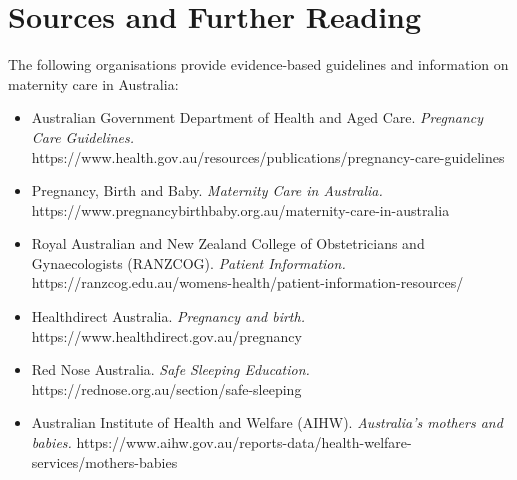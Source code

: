 \section*{Sources and Further Reading}
The following organisations provide evidence-based guidelines and information on maternity care in Australia:
\begin{itemize}
    \item Australian Government Department of Health and Aged Care. \textit{Pregnancy Care Guidelines.} https://www.health.gov.au/resources/publications/pregnancy-care-guidelines
    \item Pregnancy, Birth and Baby. \textit{Maternity Care in Australia.} https://www.pregnancybirthbaby.org.au/maternity-care-in-australia
    \item Royal Australian and New Zealand College of Obstetricians and Gynaecologists (RANZCOG). \textit{Patient Information.} https://ranzcog.edu.au/womens-health/patient-information-resources/
    \item Healthdirect Australia. \textit{Pregnancy and birth.} https://www.healthdirect.gov.au/pregnancy
    \item Red Nose Australia. \textit{Safe Sleeping Education.} https://rednose.org.au/section/safe-sleeping
    \item Australian Institute of Health and Welfare (AIHW). \textit{Australia's mothers and babies.} https://www.aihw.gov.au/reports-data/health-welfare-services/mothers-babies
\end{itemize}
